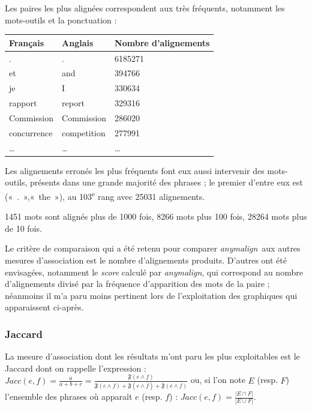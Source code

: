 \documentclass[a4paper,10pt]{article}
\newcommand{\anym}{\emph{anymalign}}
\newcommand{\guill}[1]{«~#1~»}
\begin{document}
Les paires les plus alignées correspondent aux très fréquents, notamment les mots-outils et la ponctuation :

\begin{tabular}{|l|l|l|}
\hline
Français & Anglais & Nombre d'alignements \\
\hline
. & . & 6185271 \\
et & and & 394766 \\
je & I & 330634 \\
rapport & report & 329316 \\
Commission & Commission & 286020 \\
concurrence & competition & 277991 \\
\dots & \dots & \dots \\
\hline
\end{tabular}

Les alignements erronés les plus fréquents font eux aussi intervenir des mots-outils, présents dans une grande majorité des phrases ; le premier d'entre eux est (\guill{.},\guill{the}), au 103\textsuperscript{e} rang avec 25031 alignements.

1451 mots sont alignés plus de 1000 fois, 8266 mots plus 100 fois, 28264 mots plus de 10 fois.

Le critère de comparaison qui a été retenu pour comparer \anym~aux autres mesures d'association est le nombre d'alignements produits. D'autres ont été envisagées, notamment le \emph{score} calculé par \anym, qui correspond au nombre d'alignements divisé par la fréquence d'apparition des mots de la paire ; néanmoins il m'a paru moins pertinent lors de l'exploitation des graphiques qui apparaissent ci-après.

\subsubsection{Jaccard}

La mesure d'association dont les résultats m'ont paru les plus exploitables
est le Jaccard dont on rappelle l'expression : $Jacc(e,f)=\frac{a}{a+b+c}=\frac{\mathfrak{F}(e\wedge f)}{\mathfrak{F}(e\wedge f)+\mathfrak{F}(e\wedge\overline{f})+\mathfrak{F}(\overline{e}\wedge f)}$ ou, si l'on note $E$ (resp. $F$) l'ensemble des phrases où apparaît $e$ (resp. $f$) : $Jacc(e,f)=\frac{|E\cap F|}{|E\cup F|}$.
\end{document}
